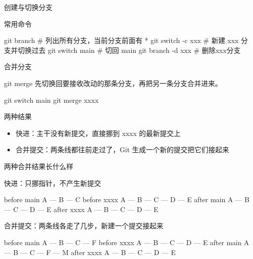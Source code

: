 \documentclass[aspectratio=169]{beamer}
\begin{document}
\begin{frame}[fragile]{创建与切换分支}
	\begin{block}{常用命令}
{
\begin{semiverbatim}
git branch                # 列出所有分支，当前分支前面有 *
git switch -c xxx         # 新建 xxx 分支并切换过去
git switch main           # 切回 main
git branch -d xxx         # 删除xxx分支
\end{semiverbatim}
}
\end{block}
\end{frame}

\begin{frame}[fragile]{合并分支}
	\begin{block}{git merge}
		先切换回要接收改动的那条分支，再把另一条分支合并进来。
		\vspace{-0.8em}
\begin{semiverbatim}
git switch main
git merge xxxx
\end{semiverbatim}
	\end{block}
	\begin{block}{两种结果}
		\begin{itemize}
			\item 快进：主干没有新提交，直接挪到 xxxx 的最新提交上
			\item 合并提交：两条线都往前走过了，Git 生成一个新的提交把它们接起来
		\end{itemize}
	\end{block}
\end{frame}

\begin{frame}[fragile]{两种合并结果长什么样}
	\begin{block}{快进：只挪指针，不产生新提交}
		{
			\begin{semiverbatim}
before main   A --- B --- C
before xxxx   A --- B --- C --- D --- E
after  main   A --- B --- C --- D --- E
after  xxxx   A --- B --- C --- D --- E
\end{semiverbatim}
		}
	\end{block}
	\begin{block}{合并提交：两条线各走了几步，新建一个提交接起来}
		{
			\begin{semiverbatim}
before main   A --- B --- C --- F
before xxxx   A --- B --- C --- D --- E
after  main   A --- B --- C --- F --- M
after  xxxx   A --- B --- C --- D --- E
\end{semiverbatim}
		}
	\end{block}
\end{frame}
\end{document}
